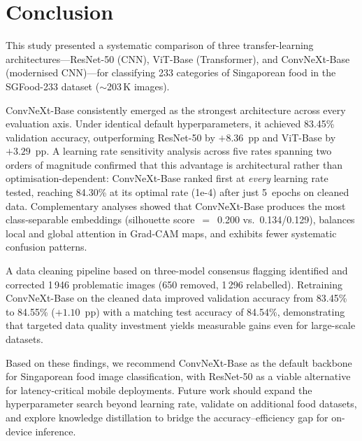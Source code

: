 \section{Conclusion}\label{sec:conclusion}

This study presented a systematic comparison of three transfer-learning
architectures---ResNet-50 (CNN), ViT-Base (Transformer), and
ConvNeXt-Base (modernised CNN)---for classifying 233 categories of
Singaporean food in the SGFood-233 dataset (${\sim}$203\,K images).

ConvNeXt-Base consistently emerged as the strongest architecture across
every evaluation axis.  Under identical default hyperparameters, it
achieved 83.45\% validation accuracy, outperforming ResNet-50 by
$+8.36$~pp and ViT-Base by $+3.29$~pp.  A learning rate sensitivity
analysis across five rates spanning two orders of magnitude confirmed
that this advantage is architectural rather than optimisation-dependent:
ConvNeXt-Base ranked first at \emph{every} learning rate tested,
reaching 84.30\% at its optimal rate (1e-4) after just 5~epochs on
cleaned data.  Complementary analyses showed that ConvNeXt-Base
produces the most class-separable embeddings (silhouette
score~$=$~0.200 vs.\ 0.134/0.129), balances local and global attention
in Grad-CAM maps, and exhibits fewer systematic confusion patterns.

A data cleaning pipeline based on three-model consensus flagging
identified and corrected 1\,946 problematic images (650 removed, 1\,296
relabelled).  Retraining ConvNeXt-Base on the cleaned data improved
validation accuracy from 83.45\% to 84.55\% ($+1.10$~pp) with a
matching test accuracy of 84.54\%, demonstrating that targeted data
quality investment yields measurable gains even for large-scale
datasets.


Based on these findings, we recommend ConvNeXt-Base as the default
backbone for Singaporean food image classification, with ResNet-50 as a
viable alternative for latency-critical mobile deployments.  Future work
should expand the hyperparameter search beyond learning rate, validate on
additional food datasets, and explore knowledge distillation to bridge
the accuracy--efficiency gap for on-device inference.
